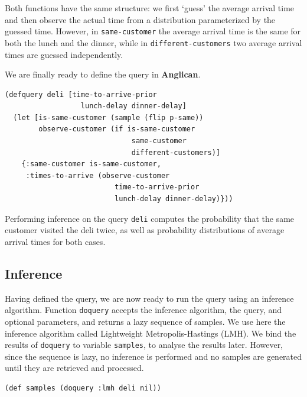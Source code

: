 \documentclass[sigconf]{acmart}
\begin{document}
Both functions have the same structure: we first `guess' the
average arrival time and then observe the actual time from a
distribution parameterized by the guessed time. However, in
\texttt{same-customer} the average arrival time is the same for
both the lunch and the dinner, while in
\texttt{different-customers} two average arrival times are
guessed independently.

We are finally ready to define the query in \textbf{Anglican}.

\begin{lstlisting}[style=default]
(defquery deli [time-to-arrive-prior
                  lunch-delay dinner-delay]
  (let [is-same-customer (sample (flip p-same))
        observe-customer (if is-same-customer
                              same-customer
                              different-customers)]
    {:same-customer is-same-customer,
     :times-to-arrive (observe-customer 
                          time-to-arrive-prior
                          lunch-delay dinner-delay)}))
\end{lstlisting}

Performing inference on the query \texttt{deli} computes the
probability that the same customer visited the deli twice, as
well as probability distributions of average arrival times for
both cases.

\subsection{Inference}
\label{seq:deli-inference}

Having defined the query, we are now ready to run the query
using an inference algorithm. Function
\texttt{doquery}\iftoggle{full}{ provided
by the \texttt{anglican.core} namespace}{} accepts the inference
algorithm, the query, and optional parameters, and returns a
lazy sequence of samples. We use here the inference algorithm
called Lightweight Metropolis-Hastings (LMH). \iftoggle{full}{The algorithm is
somewhat slow to converge but can be used with any Anglican
query, and should be robust enough for our simple problem.}{}
We bind the results of \texttt{doquery} to variable
\texttt{samples}, to analyse the results later. However, since
the sequence is lazy, no inference is performed and no samples
are generated until they are retrieved and processed.

\begin{lstlisting}[style=default]
(def samples (doquery :lmh deli nil))
\end{lstlisting}
\end{document}
